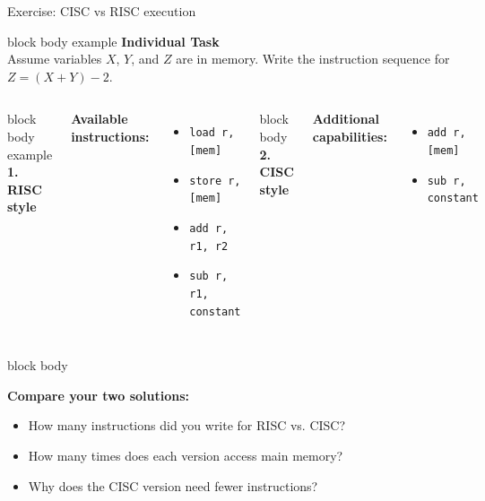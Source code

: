 \documentclass[aspectratio=169,10pt]{beamer}
\newcommand{\taskhead}[2]{%
  \begin{beamercolorbox}[rounded=true,sep=0.12cm,wd=\linewidth]{block body example}
    \small\textbf{#1}\\[0.04cm]
    \footnotesize #2
  \end{beamercolorbox}\vspace{0.1cm}}
\begin{document}
\begin{frame}[fragile]{Exercise: CISC vs RISC execution}
  \taskhead{Individual Task}{Assume variables $X$, $Y$, and $Z$ are in memory. Write the instruction sequence for $Z=(X+Y)-2$.}
  \vspace{0.08cm}
  \begin{columns}[T,onlytextwidth]
      \begin{beamercolorbox}[rounded=true,sep=0.08cm,wd=\linewidth]{block body example}
        \centering\footnotesize\textbf{1. RISC style}
      \end{beamercolorbox}
      \scriptsize
      \textbf{Available instructions:}
      \begin{itemize}\setlength{\itemsep}{1.5pt}
        \item \texttt{load r, [mem]} 
        \item \texttt{store r, [mem]} 
        \item \texttt{add r, r1, r2} 
        \item \texttt{sub r, r1, constant} 
      \end{itemize}
      \begin{beamercolorbox}[rounded=true,sep=0.08cm,wd=\linewidth]{block body}
        \centering\footnotesize\textbf{2. CISC style}
      \end{beamercolorbox}
      \scriptsize
      \textbf{Additional capabilities:}
      \begin{itemize}\setlength{\itemsep}{1.5pt}
        \item \texttt{add r, [mem]} 
        \item \texttt{sub r, constant} 
      \end{itemize}
  \end{columns}
  \vfill
  \begin{beamercolorbox}[rounded=true,sep=0.08cm,wd=\textwidth]{block body}
    \scriptsize\raggedright
    \textbf{Compare your two solutions:}
    \begin{itemize}\setlength{\itemsep}{1pt}
      \item How many instructions did you write for RISC vs. CISC?
      \item How many times does each version access main memory?
      \item Why does the CISC version need fewer instructions?
    \end{itemize}
  \end{beamercolorbox}
\end{frame}
\end{document}
